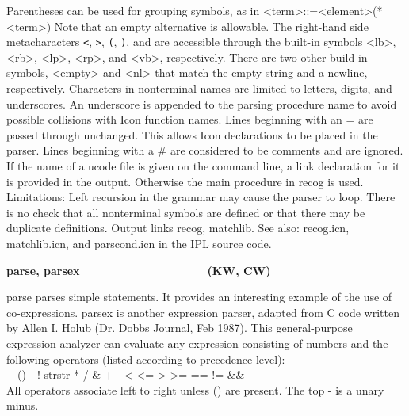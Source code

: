 

Parentheses can be used for grouping symbols, as in
\textsf{{\textless}term{\textgreater}::={\textless}element{\textgreater}({\textbar}*{\textless}term{\textgreater})
}Note that an empty alternative is allowable. The right-hand side
metacharacters \texttt{{\textless}}, \texttt{{\textgreater}},
\texttt{(}, \texttt{)}, and \texttt{{\textbar}} are accessible through
the built-in symbols \textsf{{\textless}lb{\textgreater}},
\textsf{{\textless}rb{\textgreater}},
\textsf{{\textless}lp{\textgreater}},
\textsf{{\textless}rp{\textgreater}}, and
\textsf{{\textless}vb{\textgreater}}, respectively. There are two other
build-in symbols, \textsf{{\textless}empty{\textgreater}} and
\textsf{{\textless}nl{\textgreater}} that match the empty string and a
newline, respectively. Characters in nonterminal names are limited to
letters, digits, and underscores. An underscore is appended to the
parsing procedure name to avoid possible collisions with Icon function
names. Lines beginning with an = are passed through unchanged. This
allows Icon declarations to be placed in the parser. Lines beginning
with a \# are considered to be comments and are ignored.
If the name of a ucode file is given on the command line, a
link declaration for it is provided in the output.
Otherwise the main procedure in \textsf{recog} is used. Limitations:
Left recursion in the grammar may cause the parser to
loop. There is no check that all nonterminal symbols are defined or
that there may be duplicate definitions. Output links \textsf{recog},
\textsf{matchlib}. See also: \textsf{recog.icn}, \textsf{matchlib.icn},
and \textsf{parscond.icn} in the IPL source code. 

{\sffamily\bfseries
parse, parsex\ \ \ \ \ \ \ \ \ \ \ \ \ \ \ \  \ \ \ \ (KW, CW)}

\textsf{parse} parses simple statements. It provides an
interesting example of the use of co-expressions. \textsf{parsex} is
another expression parser, adapted from C code written by Allen I.
Holub (Dr. Dobb{\textquotesingle}s Journal, Feb 1987). This
general-purpose expression analyzer can evaluate any expression
consisting of numbers and the following operators (listed according to
precedence level):\\
\textsf{\ \ () - !
{\textquotesingle}str{\textquotesingle}str{\textquotesingle} * / \& + -
{\textless} {\textless}= {\textgreater} {\textgreater}= == != \&\&
{\textbar}{\textbar}} \\
All operators associate left to right unless () are present. The top -
is a unary minus. 

